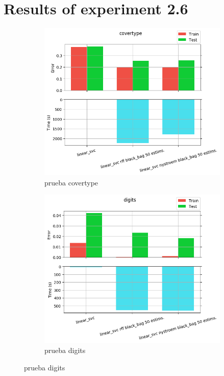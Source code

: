 
\chapter{Results of experiment 2.6} %

\label{Appendix2-6} %

\begin{figure}[ht]
  \centering
  \begin{subfigure}[b]{0.5\linewidth}
    \centering\includegraphics[width=\imgscale\linewidth]{Figures/2_6/covertype}
    \caption{prueba covertype}
    \label{fig:2_6_covertype}
  \end{subfigure}%
  \begin{subfigure}[b]{0.5\linewidth}
    \centering\includegraphics[width=\imgscale\linewidth]{Figures/2_6/digits}
    \caption{prueba digits}
    \label{fig:2_6_digits}
  \end{subfigure}
\end{figure}


